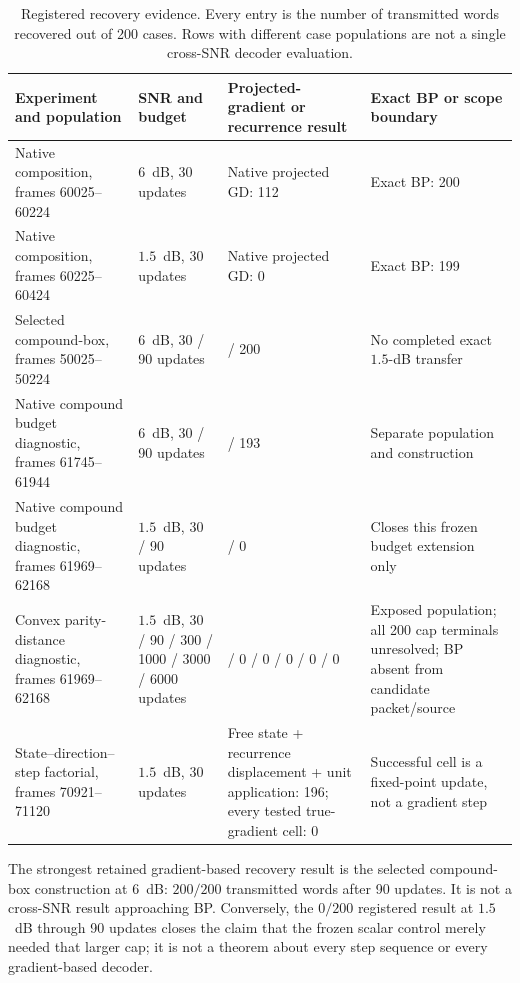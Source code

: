 \documentclass[11pt]{article}
\theoremstyle{remark}
\begin{document}
\begin{table}[H]
\centering
\caption{Registered recovery evidence.  Every entry is the number of
transmitted words recovered out of 200 cases.  Rows with different case
populations are not a single cross-SNR decoder evaluation.}
\label{tab:registered}
\small
\begin{tabularx}{\textwidth}{@{}>{\raggedright\arraybackslash}p{3.3cm}
  >{\raggedright\arraybackslash}p{2.6cm}
  >{\raggedright\arraybackslash}X
  >{\raggedright\arraybackslash}p{3.2cm}@{}}
\toprule
Experiment and population & SNR and budget & Projected-gradient or recurrence result & Exact BP or scope boundary \\
\midrule
Native composition, frames 60025--60224 & $6$~dB, 30 updates & Native projected GD: 112 & Exact BP: 200 \\
Native composition, frames 60225--60424 & $1.5$~dB, 30 updates & Native projected GD: 0 & Exact BP: 199 \\
Selected compound-box, frames 50025--50224 & $6$~dB, 30 / 90 updates & 177 / 200 & No completed exact $1.5$-dB transfer \\
Native compound budget diagnostic, frames 61745--61944 & $6$~dB, 30 / 90 updates & 113 / 193 & Separate population and construction \\
Native compound budget diagnostic, frames 61969--62168 & $1.5$~dB, 30 / 90 updates & 0 / 0 & Closes this frozen budget extension only \\
Convex parity-distance diagnostic, frames 61969--62168 & $1.5$~dB, 30 / 90 / 300 / 1000 / 3000 / 6000 updates & 0 / 0 / 0 / 0 / 0 / 0 & Exposed population; all 200 cap terminals unresolved; BP absent from candidate packet/source \\
State--direction--step factorial, frames 70921--71120 & $1.5$~dB, 30 updates & Free state + recurrence displacement + unit application: 196; every tested true-gradient cell: 0 & Successful cell is a fixed-point update, not a gradient step \\
\bottomrule
\end{tabularx}
\end{table}

The strongest retained gradient-based recovery result is the selected
compound-box construction at $6$~dB: $200/200$ transmitted words after 90
updates.  It is not a cross-SNR result approaching BP.  Conversely, the
$0/200$ registered result at $1.5$~dB through 90 updates closes the claim that
the frozen scalar control merely needed that larger cap; it is not a theorem
about every step sequence or every gradient-based decoder.
\end{document}
